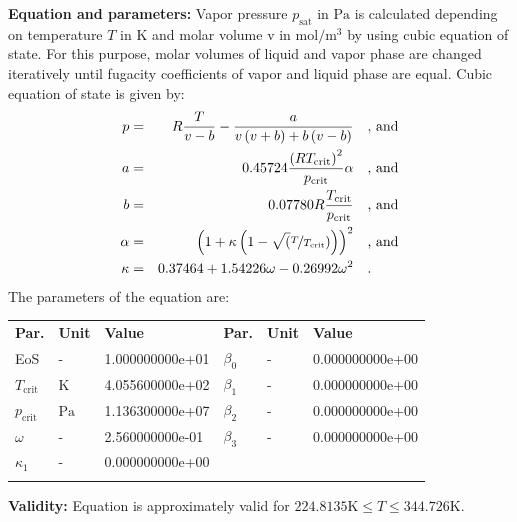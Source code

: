 \textbf{Equation and parameters:}
\newline
%
Vapor pressure $p_\mathrm{sat}$ in $\si{\pascal}$ is calculated depending on temperature $T$ in $\si{\kelvin}$ and molar volume v in $\si{\mole\per\cubic\meter}$ by using cubic equation of state. For this purpose, molar volumes of liquid and vapor phase are changed iteratively until fugacity coefficients of vapor and liquid phase are equal. Cubic equation of state is given by:
\begin{equation*}
\begin{split}
p &=& R \frac{T}{v - b} - \frac{a}{v \left(v + b\right) + b \left(v - b\right)} & \quad\text{, and} \\
a &=& 0.45724 \frac{\left(R T_\mathrm{crit} \right)^2}{p_\mathrm{crit}} \alpha & \quad\text{, and} \\
b &=& 0.07780 R \frac{T_\mathrm{crit}}{p_\mathrm{crit}} & \quad\text{, and} \\
\alpha &=& \left(1 + \kappa \left(1 - \sqrt(\nicefrac{T}{T_\mathrm{crit}}) \right) \right)^2 & \quad\text{, and} \\
\kappa &=& 0.37464 + 1.54226 \omega - 0.26992 \omega^2 & \quad\text{.}
\end{split}
\end{equation*}
%
The parameters of the equation are:
%
\begin{longtable}[l]{lll|lll}
\toprule
\addlinespace
\textbf{Par.} & \textbf{Unit} & \textbf{Value} &	\textbf{Par.} & \textbf{Unit} & \textbf{Value} \\
\addlinespace
\midrule
\endhead

\bottomrule
\endfoot
\bottomrule
\endlastfoot
\addlinespace

EoS & - & 1.000000000e+01 & $\beta_0$ & - & 0.000000000e+00 \\
$T_\mathrm{crit}$ & $\si{\kelvin}$ & 4.055600000e+02 & $\beta_1$ & - & 0.000000000e+00 \\
$p_\mathrm{crit}$ & $\si{\pascal}$ & 1.136300000e+07 & $\beta_2$ & - & 0.000000000e+00 \\
$\omega$ & - & 2.560000000e-01 & $\beta_3$ & - & 0.000000000e+00 \\
$\kappa_1$ & - & 0.000000000e+00 & & & \\

\addlinespace\end{longtable}

\textbf{Validity:}
\newline
Equation is approximately valid for $224.8135 \si{\kelvin} \leq T \leq 344.726 \si{\kelvin}$.
\newline

